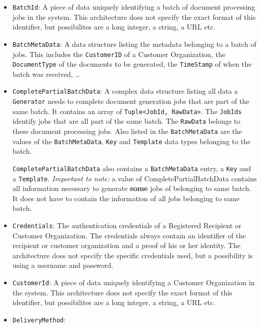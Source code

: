 \documentclass[a4paper,10pt]{article}
\begin{document}
\begin{itemize}
	\item \texttt{BatchId}: A piece of data uniquely identifying a batch of document processing jobs in the system. This architecture does not specify the exact format of this identifier, but possibilites are a long integer, a string, a URL etc.
	
	\item \texttt{BatchMetaData}: A data structure listing the metadata belonging to a batch of jobs. This includes the \texttt{CustomerID} of a Customer Organization, the \texttt{DocumentType} of the documents to be generated, the \texttt{TimeStamp} of when the batch was received, \dots
	
	\item \texttt{CompletePartialBatchData}: A complex data structure listing all data a \texttt{Generator} needs to complete document generation jobs that are part of the same batch. It contains an array of \texttt{Tuple<JobId, RawData>}. The \texttt{JobIds} identify jobs that are all part of the same batch. The \texttt{RawData} belongs to these document processing jobs. Also listed in the \texttt{BatchMetaData} are the values of the \texttt{BatchMetaData}, \texttt{Key} and \texttt{Template} data types belonging to the batch.	
	
	 \texttt{CompletePartialBatchData} also contains a \texttt{BatchMetaData} entry, a \texttt{Key} and a \texttt{Template}. \emph{Important to note:} a value of CompletePartialBatchData contains all information necessary to generate \textbf{some} jobs of belonging to same batch. It does not have to contain the information of all jobs belonging to same batch.

	\item \texttt{Credentials}: The authentication credentials of a Registered Recipient or Customer Organization. The credentials always contain an identifier of the recipient or customer organization and a proof of his or her identity. The architecture does not specify the specific credentials used, but a possibility is using a username and password.
	 
	\item \texttt{CustomerId}: A piece of data uniquely identifying a Customer Organization in the system. This architecture does not specify the exact format of this identifier, but possibilites are a long integer, a string, a URL etc.
	
	\item \texttt{DeliveryMethod}:
	

\end{itemize}
\end{document}
